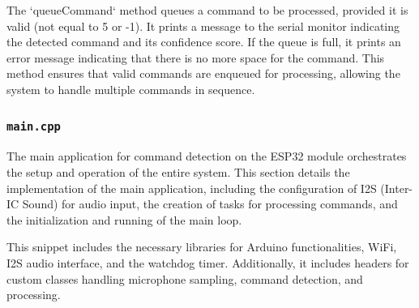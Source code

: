 \documentclass[a4paper]{report}
\begin{document}
{The `queueCommand` method queues a command to be processed, provided it is valid (not equal to 5 or -1). It prints a message to the serial monitor indicating the detected command and its confidence score. If the queue is full, it prints an error message indicating that there is no more space for the command. This method ensures that valid commands are enqueued for processing, allowing the system to handle multiple commands in sequence.

\subsubsection{\texttt{main.cpp}}
The main application for command detection on the ESP32 module orchestrates the setup and operation of the entire system. This section details the implementation of the main application, including the configuration of I2S (Inter-IC Sound) for audio input, the creation of tasks for processing commands, and the initialization and running of the main loop.

\begin{center}
\end{center}

This snippet includes the necessary libraries for Arduino functionalities, WiFi, I2S audio interface, and the watchdog timer. Additionally, it includes headers for custom classes handling microphone sampling, command detection, and processing.

\begin{center}
\end{center}

}
\end{document}
